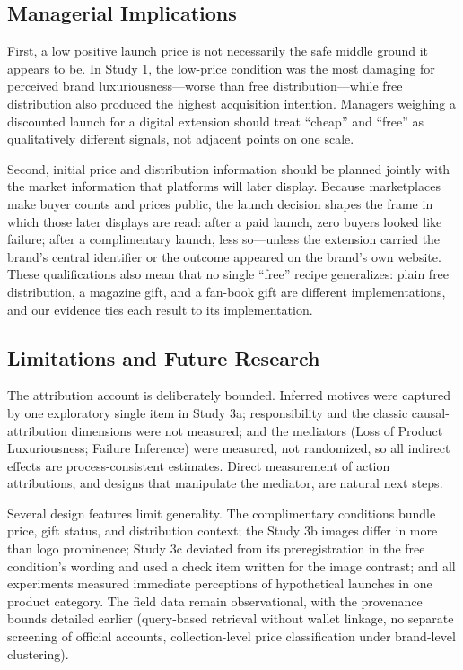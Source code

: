 \documentclass[12pt, a4paper]{article}
\begin{document}
\subsection{Managerial Implications}

First, a low positive launch price is not necessarily the safe middle ground it appears to be. In Study 1, the low-price condition was the most damaging for perceived brand luxuriousness---worse than free distribution---while free distribution also produced the highest acquisition intention. Managers weighing a discounted launch for a digital extension should treat ``cheap'' and ``free'' as qualitatively different signals, not adjacent points on one scale.

Second, initial price and distribution information should be planned jointly with the market information that platforms will later display. Because marketplaces make buyer counts and prices public, the launch decision shapes the frame in which those later displays are read: after a paid launch, zero buyers looked like failure; after a complimentary launch, less so---unless the extension carried the brand's central identifier or the outcome appeared on the brand's own website. These qualifications also mean that no single ``free'' recipe generalizes: plain free distribution, a magazine gift, and a fan-book gift are different implementations, and our evidence ties each result to its implementation.

\subsection{Limitations and Future Research}

The attribution account is deliberately bounded. Inferred motives were captured by one exploratory single item in Study 3a; responsibility and the classic causal-attribution dimensions were not measured; and the mediators (Loss of Product Luxuriousness; Failure Inference) were measured, not randomized, so all indirect effects are process-consistent estimates. Direct measurement of action attributions, and designs that manipulate the mediator, are natural next steps.

Several design features limit generality. The complimentary conditions bundle price, gift status, and distribution context; the Study 3b images differ in more than logo prominence; Study 3c deviated from its preregistration in the free condition's wording and used a check item written for the image contrast; and all experiments measured immediate perceptions of hypothetical launches in one product category. The field data remain observational, with the provenance bounds detailed earlier (query-based retrieval without wallet linkage, no separate screening of official accounts, collection-level price classification under brand-level clustering).
\end{document}
